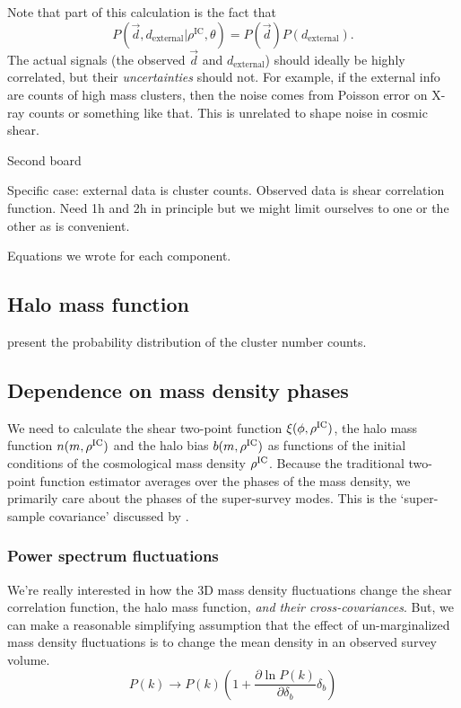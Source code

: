 \documentclass[preprint]{aastex}
\newcommand{\beq}{\begin{equation}}
\newcommand{\eeq}{\end{equation}}
\newcommand{\skyangle}{\phi}
\newcommand{\rhoic}{\rho^{\rm IC}}
\begin{document}
Note that part of this calculation is the fact that
\beq
P(\vec{d},d_\text{external}|\rho^\text{IC},\theta) = P(\vec{d})P(d_\text{external}).
\eeq
The actual signals (the observed $\vec{d}$ and $d_\text{external}$) should ideally be highly
correlated, but their {\em uncertainties} should not.  For example, if the external info are counts
of high mass clusters, then the noise comes from Poisson error on X-ray counts or something like
that.  This is unrelated to shape noise in cosmic shear.


Second board

Specific case: external data is cluster counts.  Observed data is shear correlation function.  Need
1h and 2h in principle but we might limit ourselves to one or the other as is convenient.

Equations we wrote for each component.


\subsection{Halo mass function}
\citet{lima2004} present the probability distribution of the cluster number counts.


\subsection{Dependence on mass density phases} %
\label{sub:dependence_on_mass_density_phases}
We need to calculate the shear two-point function $\xi(\skyangle, \rhoic)$, 
the halo mass function $n(m, \rhoic)$
and the halo bias $b(m, \rhoic)$ as functions of the initial conditions of the 
cosmological mass density $\rhoic$. 
Because the traditional two-point function estimator averages over the phases 
of the mass density, we primarily care about the phases of the super-survey 
modes. This is the `super-sample covariance' discussed by 
\citet{takada2013}.

\subsubsection{Power spectrum fluctuations}
We're really interested in how the 3D mass density fluctuations change the
shear correlation function, the halo mass function, \emph{and their 
cross-covariances}. But, we can make a reasonable simplifying assumption that 
the effect of un-marginalized mass density fluctuations is to change the mean density 
in an observed survey volume. 
\begin{equation}
	P(k) \rightarrow P(k) \left(
	1 + \frac{\partial \ln P(k)}{\partial \delta_b} \delta_b\right)
\end{equation}
\end{document}
